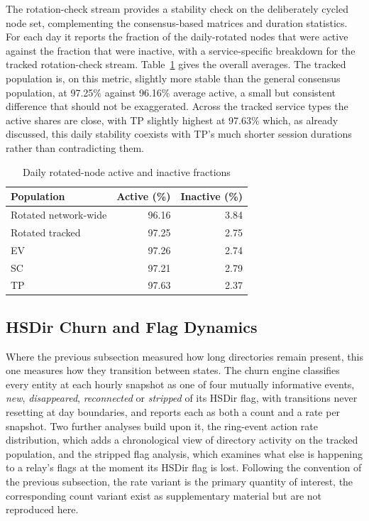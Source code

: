 \documentclass[conference]{IEEEtran}
\begin{document}
The rotation-check stream provides a stability check on the deliberately cycled node set, complementing the consensus-based matrices and duration 
statistics. For each day it reports the fraction of the daily-rotated nodes that were active against the fraction that were inactive, with a 
service-specific breakdown for the tracked rotation-check stream. Table~\ref{tab:rotated_stability} gives the overall averages. The tracked 
population is, on this metric, slightly more stable than the general consensus population, at 97.25\% against 96.16\% average active, a small but 
consistent difference that should not be exaggerated. Across the tracked service types the active shares are close, with TP slightly highest at 
97.63\% which, as already discussed, this daily stability coexists with TP's much shorter session durations rather than contradicting them.
 
\begin{table}[htbp]
\caption{Daily rotated-node active and inactive fractions}
\begin{center}
\begin{tabular}{|l|r|r|}
\hline
\textbf{Population} & \textbf{Active (\%)} & \textbf{Inactive (\%)} \\
\hline
Rotated network-wide & 96.16 & 3.84 \\
\hline
Rotated tracked & 97.25 & 2.75 \\
\hline
EV & 97.26 & 2.74 \\
\hline
SC & 97.21 & 2.79 \\
\hline
TP & 97.63 & 2.37 \\
\hline
\end{tabular}
\label{tab:rotated_stability}
\end{center}
\end{table}

\subsection{HSDir Churn and Flag Dynamics}
 
Where the previous subsection measured how long directories remain present, this one measures how they transition between states. The churn 
engine classifies every entity at each hourly snapshot as one of four mutually informative events, \emph{new}, \emph{disappeared}, 
\emph{reconnected} or \emph{stripped} of its HSDir flag, with transitions never resetting at day boundaries, and reports each as both a count 
and a rate per snapshot. Two further analyses build upon it, the ring-event action rate distribution, which adds a chronological view of directory 
activity on the tracked population, and the stripped flag analysis, which examines what else is happening to a relay's flags at the 
moment its HSDir flag is lost. Following the convention of the previous subsection, the rate variant is the primary quantity of interest, the 
corresponding count variant exist as supplementary material but are not reproduced here.
\end{document}
